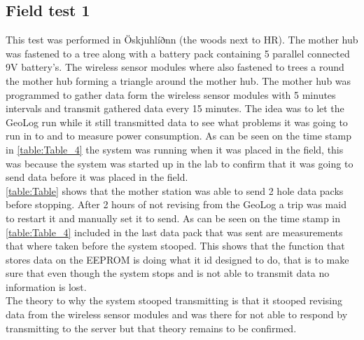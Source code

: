 \subsection{Field test 1}
This test was performed in Öskjuhlíðnn (the woods next to HR). The mother hub was fastened to a tree along with a battery pack containing 5 parallel connected 9V battery's. The wireless sensor modules where also fastened to trees a round the mother hub forming a triangle around the mother hub. The mother hub was programmed to gather data form the wireless sensor modules with 5 minutes intervals and transmit gathered data every 15 minutes. The idea was to let the GeoLog run while it still transmitted data to see what problems it was going to run in to and to measure power consumption. As can be seen on the time stamp  in \ref{table:Table_4} the system was running when it was placed in the field, this was because the system was started up in the lab to confirm that it was going to send data before it was placed in the field. \\
\ref{table:Table} shows that the mother station was able to send 2 hole data packs before stopping. After 2 hours of not revising from the GeoLog a trip was maid to restart it and manually set it to send. As can be seen on the time stamp in \ref{table:Table_4} included in the last data pack that was sent are measurements that where taken before the system stooped. This shows that the function that stores data on the EEPROM is doing what it id designed to do, that is to make sure that even though the system stops and is not able to transmit data no information is lost. \\
The theory to why the system stooped transmitting is that it stooped revising data from the wireless sensor modules and was there for not able to respond by transmitting to the server but that theory remains to be confirmed.
